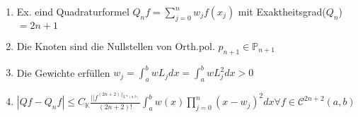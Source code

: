 \begin{theorem}
	\begin{enumerate}
		\item Ex. eind Quadraturformel $Q_nf = \sum_{j=0}^{n} w_j f(x_j)$ mit Exaktheitsgrad($Q_n$)$=2n+1$
		\item Die Knoten sind die Nullstellen von Orth.pol. $p_{n+1} \in \mathbb{P}_{n+1}$
		\item Die Gewichte erfüllen $w_j = \int_{a}^{b} wL_j dx = \int_{a}^{b} wL_j^2 dx > 0$
		\item $|Qf - Q_nf| \leq C_{\mathbb{K}} \frac{||f^{(2n+2)||_{L^\infty(a,b)}}}{(2n+2)!} \int_{a}^{b} w(x) \prod_{j=0}^{n} (x-w_j)^2 dx \forall f \in \mathcal{C}^{2n+2}(a,b)$
	\end{enumerate}
\end{theorem}

